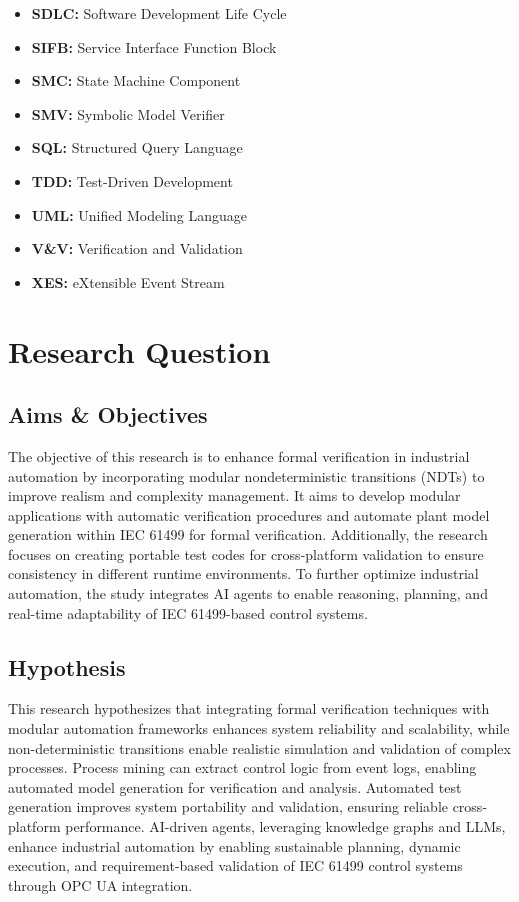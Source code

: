 \begin{itemize}
\item \textbf{SDLC:} Software Development Life Cycle
\item \textbf{SIFB:} Service Interface Function Block
\item \textbf{SMC:} State Machine Component
\item \textbf{SMV:} Symbolic Model Verifier
\item \textbf{SQL:} Structured Query Language
\item \textbf{TDD:} Test-Driven Development
\item \textbf{UML:} Unified Modeling Language
\item \textbf{V\&V:} Verification and Validation
\item \textbf{XES:} eXtensible Event Stream
\end{itemize}

\section{Research Question}
\subsection{Aims \& Objectives}
The objective of this research is to enhance formal verification in industrial automation by incorporating modular nondeterministic transitions (NDTs) to improve realism and complexity management. It aims to develop modular applications with automatic verification procedures and automate plant model generation within IEC 61499 for formal verification. Additionally, the research focuses on creating portable test codes for cross-platform validation to ensure consistency in different runtime environments. To further optimize industrial automation, the study integrates AI agents to enable reasoning, planning, and real-time adaptability of IEC 61499-based control systems.

\subsection{Hypothesis}
This research hypothesizes that integrating formal verification techniques with modular automation frameworks enhances system reliability and scalability, while non-deterministic transitions enable realistic simulation and validation of complex processes. Process mining can extract control logic from event logs, enabling automated model generation for verification and analysis. Automated test generation improves system portability and validation, ensuring reliable cross-platform performance. AI-driven agents, leveraging knowledge graphs and LLMs, enhance industrial automation by enabling sustainable planning, dynamic execution, and requirement-based validation of IEC 61499 control systems through OPC UA integration.

